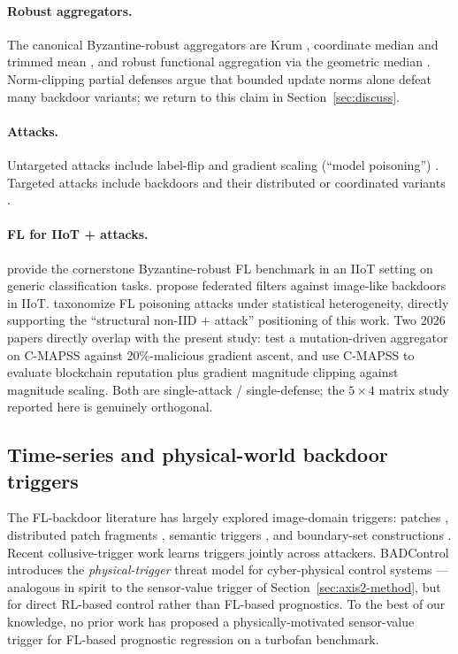 \documentclass[preprint,12pt,authoryear]{elsarticle}
\begin{document}
\paragraph{Robust aggregators.}
The canonical Byzantine-robust aggregators are Krum
\citep{Blanchard2017Krum}, coordinate median and trimmed mean
\citep{Yin2018RobustDistributed}, and robust functional
aggregation via the geometric median \citep{Pillutla2022RFA}.
Norm-clipping partial defenses \citep{Sun2019CanYouBackdoor}
argue that bounded update norms alone defeat many backdoor
variants; we return to this claim in Section~\ref{sec:discuss}.

\paragraph{Attacks.}
Untargeted attacks include label-flip and gradient scaling
(``model poisoning'')
\citep{Bhagoji2019AdversarialLens, Fang2020LocalPoisoning}.
Targeted attacks include backdoors
\citep{Bagdasaryan2020BackdoorFL} and their distributed or
coordinated variants \citep{Xie2020DBA, Lyu2024CoBA}.

\paragraph{FL for {IIoT} + attacks.}
\citet{Li2021ByzantineFLIIoT} provide the cornerstone
Byzantine-robust FL benchmark in an IIoT setting on generic
classification tasks. \citet{Hou2021FederatedFiltersIIoT}
propose federated filters against image-like backdoors in IIoT.
\citet{Djemaa2026HeterogeneityPoisoning} taxonomize FL poisoning
attacks under statistical heterogeneity, directly supporting the
``structural non-IID $+$ attack'' positioning of this work. Two
2026 papers directly overlap with the present study:
\citet{Tallat2026BioMutFedPlus} test a mutation-driven aggregator
on C-MAPSS against 20\%-malicious gradient ascent, and
\citet{Li2026TrustworthyFLIIoT} use C-MAPSS to evaluate
blockchain reputation plus gradient magnitude clipping against
magnitude scaling. Both are single-attack / single-defense; the
$5 \times 4$ matrix study reported here is genuinely orthogonal.

\subsection{Time-series and physical-world backdoor triggers}
\label{subsec:related-triggers}

The FL-backdoor literature has largely explored image-domain
triggers: patches \citep{Bagdasaryan2020BackdoorFL}, distributed
patch fragments \citep{Xie2020DBA}, semantic triggers
\citep{Bhagoji2019AdversarialLens}, and boundary-set
constructions \citep{Yang2023BoundaryTrigger}. Recent
collusive-trigger work \citep{Lyu2024CoBA} learns triggers
jointly across attackers. BADControl
\citep{Burbano2026BADControl} introduces the
\emph{physical-trigger} threat model for cyber-physical control
systems --- analogous in spirit to the sensor-value trigger of
Section~\ref{sec:axis2-method}, but for direct RL-based control
rather than FL-based prognostics. To the best of our knowledge,
no prior work has proposed a physically-motivated sensor-value
trigger for FL-based prognostic regression on a turbofan
benchmark.
\end{document}
